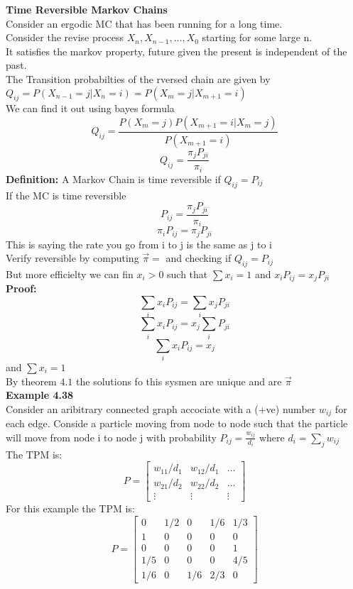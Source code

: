 \documentclass{article}
\begin{document}
\textbf{Time Reversible Markov Chains}\\
Consider an ergodic MC that has been running for a long time.\\
Consider the revise process $X_n, X_{n-1}, \dots, X_0$ starting for some large n.\\ 
It satisfies the markov property, future given the present is independent of the past.\\
The Transition probabilties of the rversed chain are given by $Q_{ij} = P(X_{n-1} = j | X_n = i) = P(X_m = j | X_{m+1} = i)$\\
We can find it out using bayes formula\\
$$Q_{ij} = \frac{P(X_m =j) P(X_{m+1} = i | X_m = j)}{P(X_{m+1} = i)}$$
$$Q_{ij} = \frac{\pi_j P_{ji}}{\pi_i}$$
\textbf{Definition:} A Markov Chain is time reversible if $Q_{ij} = P_{ij}$\\
If the MC is time reversible 
$$ P_{ij} = \frac{\pi_j P_{ji}}{\pi_i}$$
$$ \pi_i P_{ij} = \pi_j P_{ji}$$
This is saying the rate you go from i to j is the same as j to i\\
Verify reversible by computing $\vec{\pi} = $ and checking if $Q_{ij} = P_{ij}$\\
But more efficielty we can fin $x_i > 0$ such that $\sum x_i = 1$ and $x_iP_{ij} = x_j P_{ji}$\\
\textbf{Proof:}\\
$$\sum_i x_i P_{ij} = \sum_i x_j P_{ji}$$
$$\sum_i x_i P_{ij} = x_j \sum_i P_{ji}$$
$$\sum_i x_i P_{ij} = x_j$$
and $\sum x_i = 1$\\
By theorem $4.1$ the solutions fo this sysmen are unique and are $\vec{\pi}$\\
\textbf{Example 4.38}\\
Consider an aribitrary connected graph accociate with a (+ve) number $w_{ij}$ for each edge. Conside a particle moving from node to node such that the particle will move from node i to node j with probability $P_{ij} = \frac{w_{ij}}{d_i}$ where $d_i = \sum_j w_{ij}$\\
The TPM is:
$$P = \begin{bmatrix}
    w_{11}/d_1 & w_{12}/d_1 & \dots \\
    w_{21}/d_2 & w_{22}/d_2 & \dots \\
    \vdots & \vdots & \vdots
\end{bmatrix}$$
For this example the TPM is:\\
$$P = \begin{bmatrix}
    0 & 1/2 & 0 & 1/6 & 1/3 \\
    1 & 0 & 0 & 0 & 0 \\
    0 & 0 & 0 & 0 & 1 \\ 
    1/5 & 0 & 0 & 0 & 4/5 \\
    1/6 & 0 & 1/6 & 2/3 & 0
\end{bmatrix}$$
\end{document}

